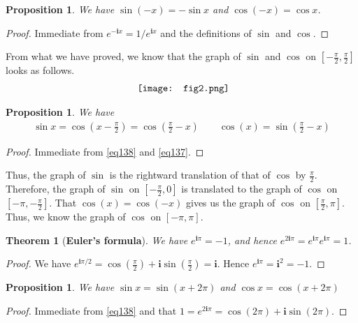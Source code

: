 \documentclass[12pt,b5paper,notitlepage]{article}
\theoremstyle{definition}
\theoremstyle{plain}
\newtheorem{thm}[df]{Theorem}
\newtheorem{pp}[df]{Proposition}
\newcommand{\im}{\mathbf{i}}
\numberwithin{equation}{section}
\begin{document}
\begin{pp}
We have $\sin(-x)=-\sin x$ and $\cos(-x)=\cos x$.
\end{pp}


\begin{proof}
Immediate from $e^{-\im x}=1/e^{\im x}$ and the definitions of $\sin$ and $\cos$.
\end{proof}


From what we have proved, we know that the graph of $\sin$ and $\cos$ on $[-\frac\pi2,\frac\pi2]$ looks as follows.
\begin{align*}
\vcenter{\hbox{{
			\texttt{[image: fig2.png]}}}}
\end{align*}

\begin{pp}
We have
\begin{gather*}
\sin x=\cos(x-\frac\pi2)=\cos(\frac\pi2-x)\qquad \cos(x)=\sin(\frac\pi 2-x)
\end{gather*}
\end{pp}

\begin{proof}
Immediate from \eqref{eq138} and \eqref{eq137}.
\end{proof}
Thus, the graph of $\sin$ is the rightward translation of that of $\cos$ by $\frac\pi 2$. Therefore, the graph of $\sin$ on $[-\frac\pi2,0]$ is translated to the graph of $\cos$ on $[-\pi,-\frac\pi2]$. That $\cos(x)=\cos(-x)$ gives us the graph of $\cos$ on $[\frac\pi2,\pi]$. Thus, we know the graph of $\cos$ on $[-\pi,\pi]$. 



\begin{thm}[\textbf{Euler's formula}] 
We have $e^{\im\pi}=-1$, and hence $e^{2\im\pi}=e^{\im\pi}e^{\im\pi}=1$.
\end{thm}


\begin{proof}
We have $e^{\im\pi/2}=\cos(\frac\pi2)+\im\sin(\frac\pi2)=\im$. Hence $e^{\im\pi}=\im^2=-1$.
\end{proof}

\begin{pp}
We have $\sin x=\sin(x+2\pi)$ and $\cos x=\cos(x+2\pi)$
\end{pp}


\begin{proof}
Immediate from \eqref{eq138} and that $1=e^{2\im\pi}=\cos(2\pi)+\im\sin(2\pi)$.
\end{proof}
\end{document}
